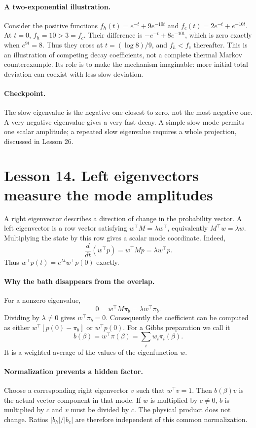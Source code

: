 \paragraph{A two-exponential illustration.}
Consider the positive functions
$f_h(t)=e^{-t}+9e^{-10t}$ and $f_c(t)=2e^{-t}+e^{-10t}$.
At $t=0$, $f_h=10>3=f_c$. Their difference is
$-e^{-t}+8e^{-10t}$, which is zero exactly when $e^{9t}=8$.
Thus they cross at $t=(\log8)/9$, and $f_h<f_c$ thereafter.
This is an illustration of competing decay coefficients, not a complete
thermal Markov counterexample. Its role is to make the mechanism imaginable:
more initial total deviation can coexist with less slow deviation.

\paragraph{Checkpoint.}
The slow eigenvalue is the negative one closest to zero, not the most negative
one. A very negative eigenvalue gives a very fast decay. A simple slow mode
permits one scalar amplitude; a repeated slow eigenvalue requires a whole
projection, discussed in Lesson 26.

\clearpage
\section*{Lesson 14. Left eigenvectors measure the mode amplitudes}
A right eigenvector describes a direction of change in the probability
vector. A left eigenvector is a row vector satisfying
$w^\top M=\lambda w^\top$, equivalently $M^\top w=\lambda w$.
Multiplying the state by this row gives a scalar mode coordinate. Indeed,
\[
\frac{d}{dt}(w^\top p)=w^\top Mp=\lambda w^\top p.
\]
Thus $w^\top p(t)=e^{\lambda t}w^\top p(0)$ exactly.

\paragraph{Why the bath disappears from the overlap.}
For a nonzero eigenvalue,
\[
0=w^\top M\pi_b=\lambda w^\top\pi_b.
\]
Dividing by $\lambda\ne0$ gives $w^\top\pi_b=0$. Consequently the
coefficient can be computed as either $w^\top[p(0)-\pi_b]$ or
$w^\top p(0)$. For a Gibbs preparation we call it
\[
b(\beta)=w^\top\pi(\beta)=\sum_i w_i\pi_i(\beta).
\]
It is a weighted average of the values of the eigenfunction $w$.

\paragraph{Normalization prevents a hidden factor.}
Choose a corresponding right eigenvector $v$ such that $w^\top v=1$.
Then $b(\beta)v$ is the actual vector component in that mode. If $w$ is
multiplied by $c\ne0$, $b$ is multiplied by $c$ and $v$ must be divided by
$c$. The physical product does not change. Ratios $|b_h|/|b_c|$ are therefore
independent of this common normalization.

